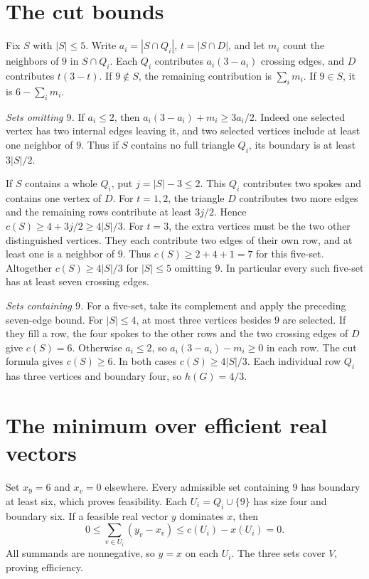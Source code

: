 \documentclass[11pt,a4paper]{article}
\newcommand{\cut}{c}
\begin{document}
\section*{The cut bounds}
Fix \(S\) with \(|S|\le5\). Write \(a_i=|S\cap Q_i|\), \(t=|S\cap D|\), and
let \(m_i\) count the neighbors of \(9\) in \(S\cap Q_i\). Each \(Q_i\)
contributes \(a_i(3-a_i)\) crossing edges, and \(D\) contributes \(t(3-t)\).
If \(9\notin S\), the remaining contribution is \(\sum_i m_i\).
If \(9\in S\), it is \(6-\sum_i m_i\).

\textit{Sets omitting \(9\).}
If \(a_i\le2\), then \(a_i(3-a_i)+m_i\ge 3a_i/2\).
Indeed one selected vertex has two internal edges leaving it, and two selected
vertices include at least one neighbor of \(9\). Thus if \(S\) contains no full
triangle \(Q_i\), its boundary is at least \(3|S|/2\).

\newpage
If \(S\) contains a whole \(Q_i\), put \(j=|S|-3\le2\). This \(Q_i\)
contributes two spokes and contains one vertex of \(D\). For \(t=1,2\),
the triangle \(D\) contributes two more edges and the remaining rows contribute
at least \(3j/2\). Hence \(\cut(S)\ge4+3j/2\ge4|S|/3\).
For \(t=3\), the extra vertices must be the two other distinguished vertices.
They each contribute two edges of their own row, and at least one is a neighbor
of \(9\). Thus \(\cut(S)\ge2+4+1=7\) for this five-set.
Altogether \(\cut(S)\ge4|S|/3\) for \(|S|\le5\) omitting \(9\).
In particular every such five-set has at least seven crossing edges.

\textit{Sets containing \(9\).}
For a five-set, take its complement and apply the preceding seven-edge bound.
For \(|S|\le4\), at most three vertices besides \(9\) are selected. If they fill
a row, the four spokes to the other rows and the two crossing edges of \(D\)
give \(\cut(S)=6\). Otherwise \(a_i\le2\), so
\(a_i(3-a_i)-m_i\ge0\) in each row. The cut formula gives \(\cut(S)\ge6\).
In both cases \(\cut(S)\ge4|S|/3\). Each individual row \(Q_i\) has three
vertices and boundary four, so \(h(G)=4/3\).

\section*{The minimum over efficient real vectors}
Set \(x_9=6\) and \(x_v=0\) elsewhere. Every admissible set containing \(9\)
has boundary at least six, which proves feasibility. Each \(U_i=Q_i\cup\{9\}\)
has size four and boundary six. If a feasible real vector \(y\) dominates \(x\),
then
\[
0\le\sum_{v\in U_i}(y_v-x_v)\le \cut(U_i)-x(U_i)=0 .
\]
All summands are nonnegative, so \(y=x\) on each \(U_i\). The three sets cover
\(V\), proving efficiency.
\end{document}
